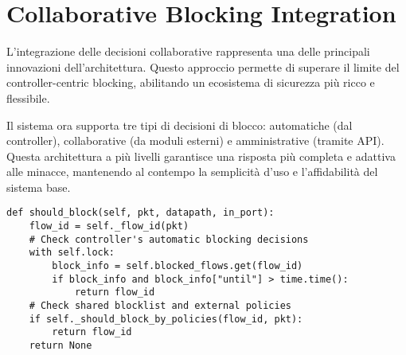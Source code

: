 \section{Collaborative Blocking Integration}
L'integrazione delle decisioni collaborative rappresenta una delle principali innovazioni dell'architettura. Questo approccio permette di superare il limite del controller-centric blocking, abilitando un ecosistema di sicurezza più ricco e flessibile.\par
Il sistema ora supporta tre tipi di decisioni di blocco: automatiche (dal controller), collaborative (da moduli esterni) e amministrative (tramite API). Questa architettura a più livelli garantisce una risposta più completa e adattiva alle minacce, mantenendo al contempo la semplicità d'uso e l'affidabilità del sistema base.
\begin{verbatim}
def should_block(self, pkt, datapath, in_port):
    flow_id = self._flow_id(pkt)
    # Check controller's automatic blocking decisions
    with self.lock:
        block_info = self.blocked_flows.get(flow_id)
        if block_info and block_info["until"] > time.time():
            return flow_id
    # Check shared blocklist and external policies
    if self._should_block_by_policies(flow_id, pkt):
        return flow_id
    return None
\end{verbatim}
